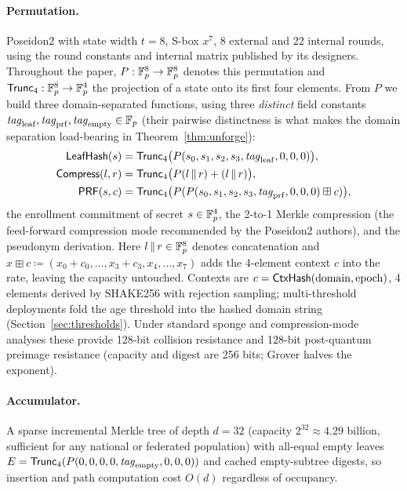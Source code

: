 \documentclass[11pt]{article}
\theoremstyle{definition}
\begin{document}
\paragraph{Permutation.} Poseidon2 \cite{poseidon2} with state width $t = 8$, S-box $x^7$,
8 external and 22 internal rounds, using the round constants and internal matrix published
by its designers. Throughout the paper, $P : \mathbb{F}_p^8 \to \mathbb{F}_p^8$ denotes this permutation and
$\mathsf{Trunc}_4 : \mathbb{F}_p^8 \to \mathbb{F}_p^4$ the projection of a state onto its first four elements. From
$P$ we build three domain-separated functions, using three \emph{distinct} field
constants $\mathit{tag}_{\mathrm{leaf}}, \mathit{tag}_{\mathrm{prf}},
\mathit{tag}_{\mathrm{empty}} \in \mathbb{F}_p$ (their pairwise distinctness is what makes the
domain separation load-bearing in Theorem~\ref{thm:unforge}):
\begin{align*}
\mathsf{LeafHash}(s) &= \mathsf{Trunc}_4\bigl(P(s_0, s_1, s_2, s_3, \mathit{tag}_{\mathrm{leaf}}, 0, 0, 0)\bigr),\\
\mathsf{Compress}(l, r) &= \mathsf{Trunc}_4\bigl(P(l \,\|\, r) + (l \,\|\, r)\bigr),\\
\mathsf{PRF}(s, c) &= \mathsf{Trunc}_4\bigl(P(P(s_0, s_1, s_2, s_3, \mathit{tag}_{\mathrm{prf}}, 0, 0, 0) \boxplus c)\bigr),
\end{align*}
the enrollment commitment of secret $s \in \mathbb{F}_p^4$, the 2-to-1 Merkle compression (the
feed-forward compression mode recommended by the Poseidon2 authors), and the pseudonym
derivation. Here $l \,\|\, r \in \mathbb{F}_p^8$ denotes concatenation and $x \boxplus c \coloneqq
(x_0 + c_0, \ldots, x_3 + c_3, x_4, \ldots, x_7)$ adds the 4-element context $c$ into the
rate, leaving the capacity untouched. Contexts are $c
= \mathsf{CtxHash}(\mathrm{domain}, \mathrm{epoch})$, 4 elements derived by SHAKE256 with
rejection sampling; multi-threshold deployments fold the age threshold into the hashed
domain string (Section~\ref{sec:thresholds}). Under standard sponge and compression-mode analyses these provide
128-bit collision resistance and 128-bit post-quantum preimage resistance (capacity and
digest are 256 bits; Grover \cite{grover} halves the exponent).

\paragraph{Accumulator.} A sparse incremental Merkle tree \cite{merkle} of depth $d = 32$
(capacity $2^{32} \approx 4.29$ billion, sufficient for any national or federated
population) with all-equal empty leaves $E =
\mathsf{Trunc}_4(P(0,0,0,0,\mathit{tag}_{\mathrm{empty}},0,0,0))$ and cached empty-subtree digests,
so insertion and path computation cost $O(d)$ regardless of occupancy.
\end{document}
